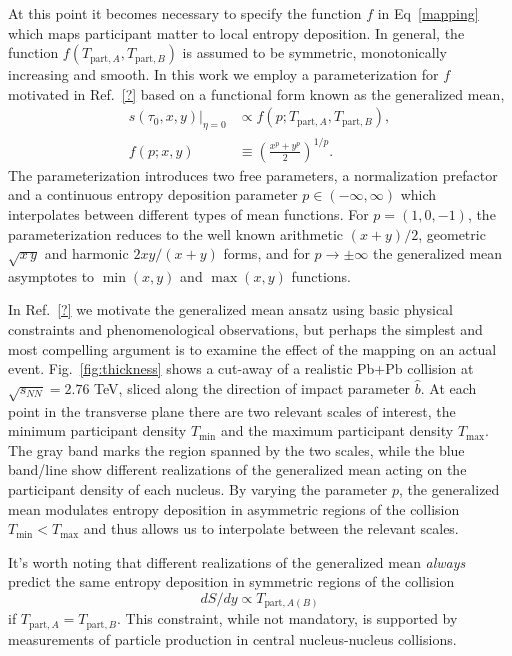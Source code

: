 \documentclass[aps,prc,reprint,amsmath,nofootinbib]{revtex4-1}
\newcommand{\sqrts}{\sqrt{s_{NN}}}
\newcommand{\TA}{T_{\text{part},A}}
\newcommand{\TB}{T_{\text{part},B}}
\begin{document}
At this point it becomes necessary to specify the function $f$ in Eq~\eqref{mapping} which maps participant matter to local entropy deposition. In general, the function $f(\TA, \TB)$ is assumed to be symmetric, monotonically increasing and smooth. In this work we employ a parameterization for $f$ motivated in Ref.~\ref{?} based on a functional form known as the generalized mean,
\begin{align}
    \label{entropy_propto}
    s(\tau_0, x, y)\vert_{\eta=0} &\propto f(p; \TA, \TB), \\
    f(p; x, y) &\equiv \left( \frac{x^p + y^p}{2} \right)^{1/p}.
\end{align}
The parameterization introduces two free parameters, a normalization prefactor and a continuous entropy deposition parameter $p\in(-\infty, \infty)$ which interpolates between different types of mean functions. For ${p=(1, 0, -1)}$, the parameterization reduces to the well known arithmetic $(x+y)/2$, geometric $\sqrt{x\,y}$ and harmonic $2 x y/(x+y)$ forms, and for $p\rightarrow \pm\infty$ the generalized mean asymptotes to $\min(x,y)$ and $\max(x,y)$ functions.

In Ref.~\ref{?} we motivate the generalized mean ansatz using basic physical constraints and phenomenological observations, but perhaps the simplest and most compelling argument is to examine the effect of the mapping on an actual event. Fig.~\ref{fig:thickness} shows a cut-away of a realistic Pb+Pb collision at $\sqrts=2.76$ TeV, sliced along the direction of impact parameter $\hat{b}$. At each point in the transverse plane there are two relevant scales of interest, the minimum participant density $T_\text{min}$ and the maximum participant density $T_\text{max}$. The gray band marks the region spanned by the two scales, while the blue band/line show different realizations of the generalized mean acting on the participant density of each nucleus. By varying the parameter $p$, the generalized mean modulates entropy deposition in asymmetric regions of the collision $T_\text{min} < T_\text{max}$ and thus allows us to interpolate between the relevant scales. 

It's worth noting that different realizations of the generalized mean \emph{always} predict the same entropy deposition in symmetric regions of the collision
\begin{equation}
    dS/dy \propto T_{\text{part},A(B)}
\end{equation}
if $\TA = \TB$. This constraint, while not mandatory, is supported by measurements of particle production in central nucleus-nucleus collisions.
\end{document}
